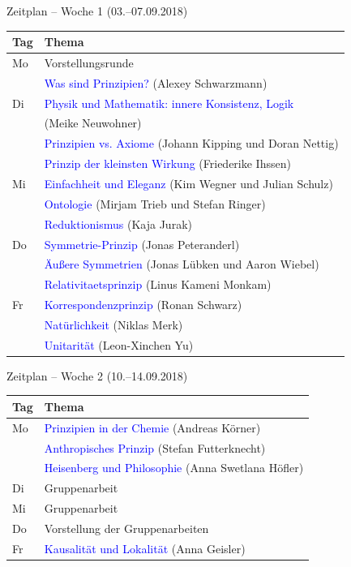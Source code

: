 \documentclass[hyperref={pdfpagelabels=false},ngerman]{beamer}
\begin{document}
\newcommand{\thema}[1]{\textcolor{blue}{#1}}
\newcommand{\person}[1]{(#1)}

\begin{frame}{Zeitplan -- Woche 1 (03.--07.09.2018)}
  \begin{tabularx}{\textwidth}{ll}
    Tag & Thema \\
    \midrule
    Mo & Vorstellungsrunde\\
       & \thema{Was sind Prinzipien?} (Alexey Schwarzmann)\\
    Di & \thema{Physik und Mathematik: innere Konsistenz, Logik}\\
       & (Meike Neuwohner)\\
       & \thema{Prinzipien vs. Axiome} (Johann Kipping und Doran Nettig)\\
       & \thema{Prinzip der kleinsten Wirkung} (Friederike Ihssen)\\
    Mi & \thema{Einfachheit und Eleganz} (Kim Wegner und Julian Schulz)\\
       & \thema{Ontologie} (Mirjam Trieb und Stefan Ringer)\\
       & \thema{Reduktionismus} (Kaja Jurak)\\
    Do & \thema{Symmetrie-Prinzip} (Jonas Peteranderl)\\
       & \thema{Äußere Symmetrien} (Jonas Lübken und Aaron Wiebel)\\
       & \thema{Relativitaetsprinzip} (Linus Kameni Monkam)\\
    Fr & \thema{Korrespondenzprinzip} (Ronan Schwarz)\\
       & \thema{Natürlichkeit} (Niklas Merk)\\
       & \thema{Unitarität} (Leon-Xinchen Yu)\\
  \end{tabularx}
\end{frame}

\begin{frame}{Zeitplan -- Woche 2 (10.--14.09.2018)}
  \begin{tabularx}{\textwidth}{ll}
    Tag & Thema \\
    \midrule
    Mo & \thema{Prinzipien in der Chemie} (Andreas Körner)\\
       & \thema{Anthropisches Prinzip} (Stefan Futterknecht)\\
       & \thema{Heisenberg und Philosophie} (Anna Swetlana Höfler)\\
    Di & Gruppenarbeit\\
    Mi & Gruppenarbeit\\
    Do & Vorstellung der Gruppenarbeiten\\
    Fr & \thema{Kausalität und Lokalität} (Anna Geisler)\\
  \end{tabularx}
\end{frame}
\end{document}
